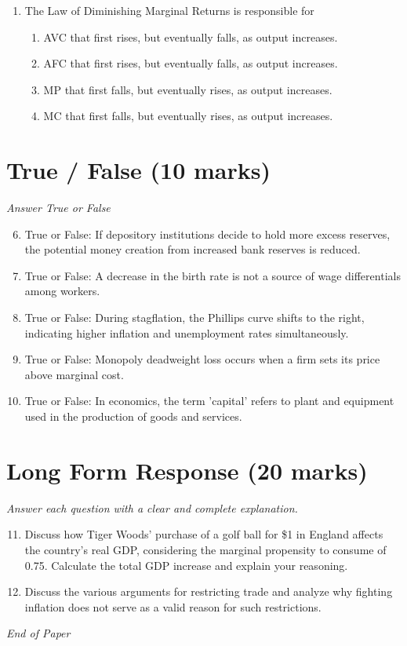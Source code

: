 \documentclass[12pt]{article}
\begin{document}
\begin{enumerate}[label=\arabic*.]
\begin{enumerate}[label=(\alph*)]
    \item \$20
    \item \$180
    \item \$2,000
    \item Greater than $200 but less than $500
\end{enumerate}
\item The Law of Diminishing Marginal Returns is responsible for
\begin{enumerate}[label=(\alph*)]
    \item AVC that first rises, but eventually falls, as output increases.
    \item AFC that first rises, but eventually falls, as output increases.
    \item MP that first falls, but eventually rises, as output increases.
    \item MC that first falls, but eventually rises, as output increases.
\end{enumerate}
\end{enumerate}

\section*{True / False (10 marks)}
\textit{Answer True or False}
\begin{enumerate}[label=\arabic*.]
\setcounter{enumi}{5}
\item True or False: If depository institutions decide to hold more excess reserves, the potential money creation from increased bank reserves is reduced.
\item True or False: A decrease in the birth rate is not a source of wage differentials among workers.
\item True or False: During stagflation, the Phillips curve shifts to the right, indicating higher inflation and unemployment rates simultaneously.
\item True or False: Monopoly deadweight loss occurs when a firm sets its price above marginal cost.
\item True or False: In economics, the term 'capital' refers to plant and equipment used in the production of goods and services.
\end{enumerate}

\section*{Long Form Response (20 marks)}
\textit{Answer each question with a clear and complete explanation.}
\begin{enumerate}[label=\arabic*.]
\setcounter{enumi}{10}
\item Discuss how Tiger Woods' purchase of a golf ball for \$1 in England affects the country's real GDP, considering the marginal propensity to consume of 0.75. Calculate the total GDP increase and explain your reasoning.
\item Discuss the various arguments for restricting trade and analyze why fighting inflation does not serve as a valid reason for such restrictions.
\end{enumerate}

\vfill
\noindent\textit{End of Paper}
\end{document}
